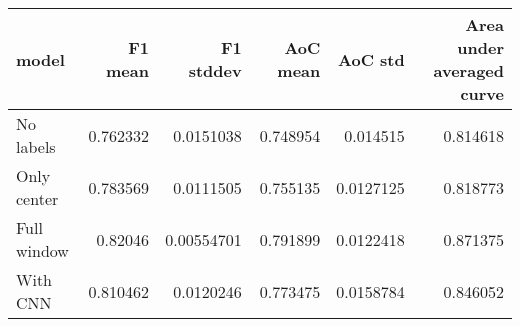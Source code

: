 \begin{tabular}{lrrrrr}
\toprule
 model       &   F1 mean &   F1 stddev &   AoC mean &   AoC std &   Area under averaged curve \\
\midrule
 No labels   &  0.762332 &  0.0151038  &   0.748954 & 0.014515  &                    0.814618 \\
 Only center &  0.783569 &  0.0111505  &   0.755135 & 0.0127125 &                    0.818773 \\
 Full window &  0.82046  &  0.00554701 &   0.791899 & 0.0122418 &                    0.871375 \\
 With CNN    &  0.810462 &  0.0120246  &   0.773475 & 0.0158784 &                    0.846052 \\
\bottomrule
\end{tabular}